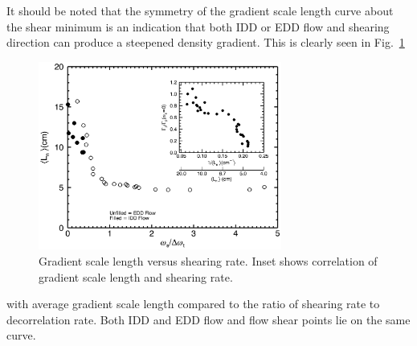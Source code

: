 \documentclass[%
 aip,
 amsmath,amssymb,
 preprint,%
]{revtex4-1}
\begin{document}
It should be noted that the symmetry of the gradient scale length curve about the shear minimum is an indication that both IDD or EDD flow and shearing direction can produce a steepened density gradient. This is clearly seen in
Fig.~\ref{fig:shearandgrad}
\begin{figure}
\begin{center}
\includegraphics[width=8cm]{shearandgrad.png}%
\end{center}
\caption{\label{fig:shearandgrad} Gradient scale length versus shearing rate. Inset shows correlation of gradient scale length and shearing rate.}
\end{figure}
with average gradient scale length compared to the ratio of shearing rate to decorrelation rate. Both IDD and EDD flow and flow shear points lie on the same curve.
\end{document}
